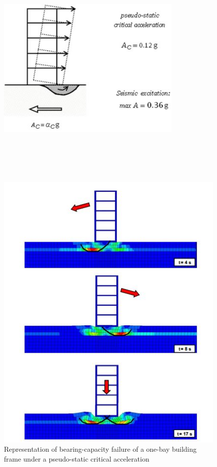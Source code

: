 \documentclass[12pt,a4paper]{report}
\begin{document}
   \begin{figure}[!h]
   	\centering
   	\begin{minipage}[b]{0.45\textwidth}
   		\includegraphics[width=9cm, height=12cm, keepaspectratio]{newmark5}
   		\caption{Representation of bearing-capacity failure of a one-bay building frame under a pseudo-static critical acceleration}
   		\label{new5}
   	\end{minipage}
   	\hfill
   	\begin{minipage}[b]{0.45\textwidth}
   		\includegraphics[width=\textwidth]{newmark4}

\end{minipage}
\end{figure}
\end{document}
